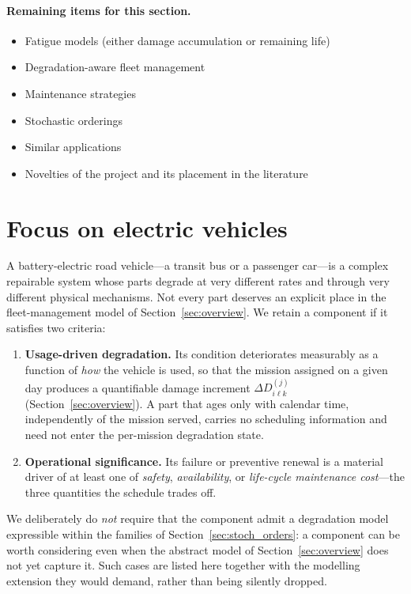 \documentclass[11pt,a4paper]{article}
\theoremstyle{plain}
\theoremstyle{definition}
\theoremstyle{remark}
\begin{document}
\paragraph{Remaining items for this section.}
\begin{itemize}
    \item[$\checkmark$] Fatigue models (either damage accumulation or remaining life)
    \item[$\square$] Degradation-aware fleet management
    \item[$\checkmark$] Maintenance strategies
    \item[$\checkmark$] Stochastic orderings
    \item[$\square$] Similar applications
    \item[$\square$] Novelties of the project and its placement in the literature
\end{itemize}

\section{Focus on electric vehicles}

A battery-electric road vehicle---a transit bus or a passenger car---is a complex repairable system whose parts degrade at very different rates and through very different physical mechanisms.
Not every part deserves an explicit place in the fleet-management model of Section~\ref{sec:overview}.
We retain a component if it satisfies two criteria:
\begin{enumerate}[label=(C\arabic*)]
  \item \textbf{Usage-driven degradation.}
    Its condition deteriorates measurably as a function of \emph{how} the vehicle is used, so that the mission assigned on a given day produces a quantifiable damage increment $\Delta D^{(j)}_{i\ell k}$ (Section~\ref{sec:overview}).
    A part that ages only with calendar time, independently of the mission served, carries no scheduling information and need not enter the per-mission degradation state.
  \item \textbf{Operational significance.}
    Its failure or preventive renewal is a material driver of at least one of \emph{safety}, \emph{availability}, or \emph{life-cycle maintenance cost}---the three quantities the schedule trades off.
\end{enumerate}
We deliberately do \emph{not} require that the component admit a degradation model expressible within the families of Section~\ref{sec:stoch_orders}: a component can be worth considering even when the abstract model of Section~\ref{sec:overview} does not yet capture it.
Such cases are listed here together with the modelling extension they would demand, rather than being silently dropped.
\end{document}
